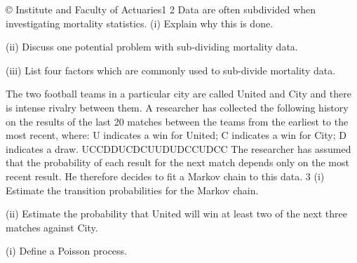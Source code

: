 © Institute and Faculty of Actuaries1
2
Data are often subdivided when investigating mortality statistics.
(i) Explain why this is done.

(ii) Discuss one potential problem with sub-dividing mortality data.

(iii) List four factors which are commonly used to sub-divide mortality data.

The two football teams in a particular city are called United and City and there is
intense rivalry between them. A researcher has collected the following history on the
results of the last 20 matches between the teams from the earliest to the most recent,
where:
U indicates a win for United;
C indicates a win for City;
D indicates a draw.
UCCDDUCDCUUDUDCCUDCC
The researcher has assumed that the probability of each result for the next match
depends only on the most recent result. He therefore decides to fit a Markov chain to
this data.
3
(i) Estimate the transition probabilities for the Markov chain.

(ii) Estimate the probability that United will win at least two of the next three
matches against City.

(i) Define a Poisson process.


